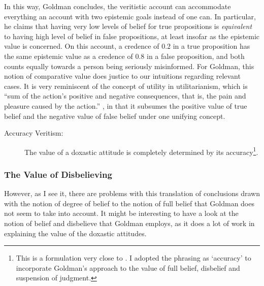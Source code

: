 \documentclass[12pt,numbers=noenddot]{scrartcl}
\begin{document}
In this way, Goldman concludes, the veritistic account can accommodate everything an account with two epistemic goals instead of one can. In particular, he claims that having very low levels of belief for true propositions is \emph{equivalent} to having high level of belief in false propositions, at least insofar as the epistemic value is concerned. On this account, a credence of $0.2$ in a true proposition has the same epistemic value as a credence of $0.8$ in a false proposition, and both counts equally towards a person being seriously misinformed. For Goldman, this notion of comparative value does justice to our intuitions regarding relevant cases. It is very reminiscent of the concept of utility in utilitarianism, which is “sum of the action's positive and negative consequences, that is, the pain and pleasure caused by the action.” \autocite{depaul_value_2001}, in that it subsumes the positive value of true belief and the negative value of false belief under one unifying concept.

\begin{description}
    \item[Accuracy Veritism:] The value of a doxastic attitude is completely determined by its accuracy\footnote{This is a formulation very close to \textcite[9]{Pettigrew2016-PETAAT-7}. I adopted the phrasing as ‘accuracy’ to incorporate Goldman's approach to the value of full belief, disbelief and suspension of judgment.}.
\end{description}

\subsubsection{The Value of Disbelieving}

However, as I see it, there are problems with this translation of conclusions drawn with the notion of degree of belief to the notion of full belief that Goldman does not seem to take into account. It might be interesting to have a look at the notion of belief and disbelieve that Goldman employs, as it does a lot of work in explaining the value of the doxastic attitudes.
\end{document}
